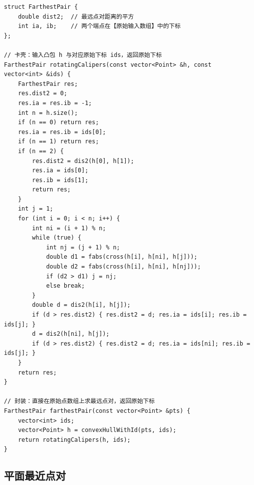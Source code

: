 \documentclass[11pt,a4paper]{ctexart}
\begin{document}
\begin{lstlisting}
struct FarthestPair {
    double dist2;  // 最远点对距离的平方
    int ia, ib;    // 两个端点在【原始输入数组】中的下标
};

// 卡壳：输入凸包 h 与对应原始下标 ids，返回原始下标
FarthestPair rotatingCalipers(const vector<Point> &h, const vector<int> &ids) {
    FarthestPair res;
    res.dist2 = 0;
    res.ia = res.ib = -1;
    int n = h.size();
    if (n == 0) return res;
    res.ia = res.ib = ids[0];
    if (n == 1) return res;
    if (n == 2) {
        res.dist2 = dis2(h[0], h[1]);
        res.ia = ids[0];
        res.ib = ids[1];
        return res;
    }
    int j = 1;
    for (int i = 0; i < n; i++) {
        int ni = (i + 1) % n;
        while (true) {
            int nj = (j + 1) % n;
            double d1 = fabs(cross(h[i], h[ni], h[j]));
            double d2 = fabs(cross(h[i], h[ni], h[nj]));
            if (d2 > d1) j = nj;
            else break;
        }
        double d = dis2(h[i], h[j]);
        if (d > res.dist2) { res.dist2 = d; res.ia = ids[i]; res.ib = ids[j]; }
        d = dis2(h[ni], h[j]);
        if (d > res.dist2) { res.dist2 = d; res.ia = ids[ni]; res.ib = ids[j]; }
    }
    return res;
}

// 封装：直接在原始点数组上求最远点对，返回原始下标
FarthestPair farthestPair(const vector<Point> &pts) {
    vector<int> ids;
    vector<Point> h = convexHullWithId(pts, ids);
    return rotatingCalipers(h, ids);
}
\end{lstlisting}

\subsection{平面最近点对}
\end{document}
